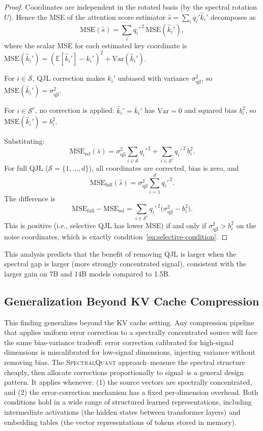 \documentclass[11pt]{article}
\newcommand{\SQ}{\textsc{SpectralQuant}}
\newcommand{\E}{\mathbb{E}}
\newcommand{\Var}{\mathrm{Var}}
\begin{document}
\begin{proof}
Coordinates are independent in the rotated basis (by the spectral rotation $U$).
Hence the MSE of the attention score estimator $\hat{s} = \sum_i q_i' \hat{k}_i'$
decomposes as
\[
  \mathrm{MSE}(\hat{s}) = \sum_i q_i'^{\,2}\, \mathrm{MSE}(\hat{k}_i'),
\]
where the scalar MSE for each estimated key coordinate is
$\mathrm{MSE}(\hat{k}_i') = (\E[\hat{k}_i'] - k_i')^2 + \Var(\hat{k}_i')$.

For $i \in \mathcal{S}$, QJL correction makes $\hat{k}_i'$ unbiased with
variance $\sigma_{\mathrm{qjl}}^2$, so $\mathrm{MSE}(\hat{k}_i') = \sigma_{\mathrm{qjl}}^2$.

For $i \in \mathcal{S}^c$, no correction is applied: $\hat{k}_i' = \bar{k}_i'$
has $\Var = 0$ and squared bias $b_i^2$, so $\mathrm{MSE}(\hat{k}_i') = b_i^2$.

Substituting:
\[
  \mathrm{MSE}_{\mathrm{sel}}(\hat{s})
  = \sigma_{\mathrm{qjl}}^2 \sum_{i \in \mathcal{S}} q_i'^{\,2}
    + \sum_{i \in \mathcal{S}^c} q_i'^{\,2}\, b_i^2.
\]
For full QJL ($\mathcal{S} = \{1,\ldots,d\}$), all coordinates are corrected,
bias is zero, and
\[
  \mathrm{MSE}_{\mathrm{full}}(\hat{s}) = \sigma_{\mathrm{qjl}}^2 \sum_{i=1}^d q_i'^{\,2}.
\]
The difference is
\[
  \mathrm{MSE}_{\mathrm{full}} - \mathrm{MSE}_{\mathrm{sel}}
  = \sum_{i \in \mathcal{S}^c} q_i'^{\,2}\bigl(\sigma_{\mathrm{qjl}}^2 - b_i^2\bigr).
\]
This is positive (i.e., selective QJL has lower MSE) if and only if
$\sigma_{\mathrm{qjl}}^2 > b_i^2$ on the noise coordinates, which is exactly
condition~\eqref{eq:selective-condition}.
\end{proof}

This analysis predicts that the benefit of removing QJL is larger when the
spectral gap is larger (more strongly concentrated signal), consistent with
the larger gain on 7B and 14B models compared to 1.5B.

\subsection{Generalization Beyond KV Cache Compression}

This finding generalizes beyond the KV cache setting.  Any compression pipeline
that applies uniform error correction to a spectrally concentrated source will
face the same bias-variance tradeoff: error correction calibrated for high-signal
dimensions is miscalibrated for low-signal dimensions, injecting variance without
removing bias.  The \SQ{} approach--measure the spectral structure cheaply,
then allocate corrections proportionally to signal--is a general design pattern.
It applies whenever: (1) the source vectors are spectrally concentrated, and (2)
the error-correction mechanism has a fixed per-dimension overhead.  Both
conditions hold in a wide range of structured learned representations, including
intermediate activations (the hidden states between transformer layers) and
embedding tables (the vector representations of tokens stored in memory).
\end{document}
